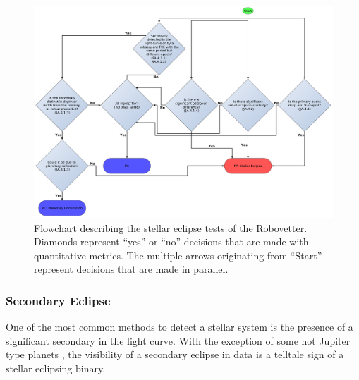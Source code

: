 



\begin{figure}[ht]
\centering
\includegraphics[width=\linewidth]{RoboVetter-Diagram-V4-SigSec.pdf}
\caption{Flowchart describing the stellar eclipse tests of the Robovetter. Diamonds represent ``yes'' or ``no'' decisions that are made with quantitative metrics. The multiple arrows originating from ``Start'' represent decisions that are made in parallel.}
\label{robovetter-sigsec-fig}
\end{figure}


\subsubsection{Secondary Eclipse}

One of the most common methods to detect a stellar system is the presence of a significant secondary in the light curve. With the exception of some hot Jupiter type planets \citep[e.g., HAT-P-7,][]{Borucki2009}, the visibility of a secondary eclipse in \kepler{} data is a telltale sign of a stellar eclipsing binary.


